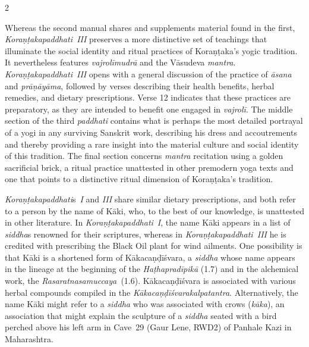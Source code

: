 \begin{nohyp}
\begin{multicols*}{2}
\begin{eng}
\noindent
Whereas the second manual shares and supplements material found in the first, \emph{Koraṇṭakapaddhati~III} preserves a more distinctive set of teachings that illuminate the social identity and ritual practices of Koraṇṭaka's yogic tradition. It nevertheless features \emph{vajrolīmudrā} and the Vāsudeva \emph{mantra}. \emph{Koraṇṭakapaddhati}~\emph{III} opens with a general discussion of the practice of \emph{āsana} and \emph{prāṇāyāma}, followed by verses describing their health benefits, herbal remedies, and dietary prescriptions. Verse 12 indicates that these practices are preparatory, as they are intended to benefit one engaged in \emph{vajrolī}. The middle section of the third \emph{paddhati} contains what is perhaps the most detailed portrayal of a yogi in any surviving Sanskrit work, describing his dress and accoutrements and thereby providing a rare insight into the material culture and social identity of this tradition. The final section concerns \emph{mantra} recitation using a golden sacrificial brick, a ritual practice unattested in other premodern yoga texts and one that points to a distinctive ritual dimension of Koraṇṭaka's tradition.

\emph{Koraṇṭakapaddhati}s~\emph{I} and \emph{III} share similar dietary prescriptions, and both refer to a person by the name of Kāki, who, to the best of our knowledge, is unattested in other literature. In \emph{Koraṇṭakapaddhati}~\emph{I}, the name Kāki appears in a list of \emph{siddha}s renowned for their scriptures, whereas in \emph{Koraṇṭakapaddhati~III} he is credited with prescribing the Black Oil plant for wind ailments. One possibility is that Kāki is a shortened form of Kākacaṇḍīśvara, a \emph{siddha} whose name appears in the lineage at the beginning of the \emph{Haṭhapradīpikā} (1.7) and in the alchemical work, the \emph{Rasaratnasamuccaya~}(1.6). Kākacaṇḍīśvara is associated with various herbal compounds compiled in the \emph{Kākacaṇḍīśvarakalpatantra}. Alternatively, the name Kāki might refer to a \emph{siddha} who was associated with crows (\emph{kāka}), an association that might explain the sculpture of a \emph{siddha} seated with a bird perched above his left arm in Cave~29 (Gaur Lene, RWD2) of Panhale Kazi in Maharashtra.


\end{eng}
\end{multicols*}
\end{nohyp}

